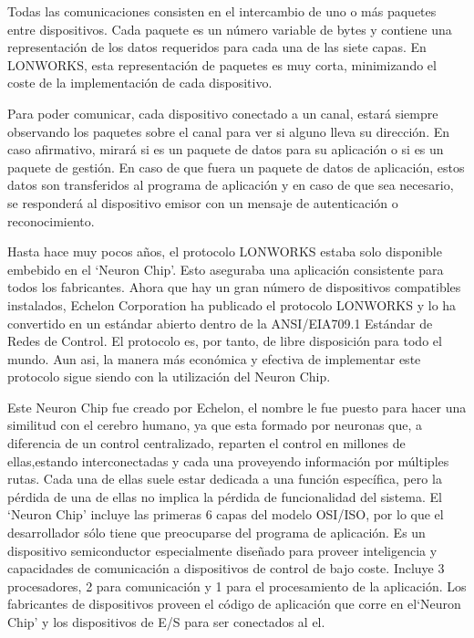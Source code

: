 Todas las comunicaciones consisten en el intercambio de uno o m\'as paquetes entre dispositivos. Cada paquete es un número variable de bytes y contiene una representación de los datos requeridos para cada una de las siete capas. En LONWORKS, esta representación de paquetes es muy corta, minimizando el coste de la implementación de cada dispositivo.


Para poder comunicar, cada dispositivo conectado a un canal, estar\'a siempre observando los paquetes sobre el canal para ver si alguno lleva su dirección. En caso afirmativo, mirar\'a si es un paquete de datos para su aplicación o si es un paquete de gestión. En caso de que fuera un paquete de datos de aplicación, estos datos son transferidos al programa de aplicación y en caso de que sea necesario, se responder\'a al dispositivo emisor con un mensaje de autenticación o reconocimiento.


Hasta hace muy pocos años, el protocolo LONWORKS estaba solo disponible embebido en el ‘Neuron Chip’. Esto aseguraba una aplicación consistente para todos los fabricantes. Ahora que hay un gran número de dispositivos compatibles instalados, Echelon Corporation ha publicado el protocolo LONWORKS y lo ha convertido en un est\'andar abierto dentro de la ANSI/EIA709.1 Est\'andar de Redes de Control. El protocolo es, por tanto, de libre disposición para todo el mundo. Aun asi, la manera m\'as económica y efectiva de implementar este protocolo sigue siendo con la utilización del Neuron Chip.

Este Neuron Chip fue creado por Echelon, el nombre le fue puesto para hacer una similitud con el cerebro humano, ya que esta formado por neuronas que, a diferencia de un control 
centralizado, reparten el control en millones de ellas,estando interconectadas y cada una proveyendo información por múltiples rutas. Cada una de ellas suele estar dedicada a una función específica, pero la pérdida de una de ellas no implica la pérdida de funcionalidad del sistema. El ‘Neuron Chip’ incluye las primeras 6 capas del modelo OSI/ISO, por lo que el desarrollador sólo tiene que preocuparse del programa de aplicación. Es un dispositivo semiconductor especialmente diseñado para proveer inteligencia y capacidades de comunicación a dispositivos de control de bajo coste. Incluye 3 procesadores, 2 para comunicación y 1 para el procesamiento de la aplicación. Los fabricantes de dispositivos proveen el código de aplicación que corre en el‘Neuron Chip’ y los dispositivos de E/S para ser conectados al el.


